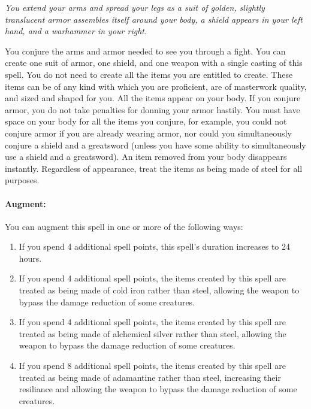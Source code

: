 \emph{You extend your arms and spread your legs as a suit of golden, slightly translucent armor assembles itself around your body, a shield appears in your left hand, and a warhammer in your right.}

You conjure the arms and armor needed to see you through a fight.
You can create one suit of armor, one shield, and one weapon with a single casting of this spell. 
You do not need to create all the items you are entitled to create.
These items can be of any kind with which you are proficient, are of masterwork quality, and sized and shaped for you. 
All the items appear on your body. 
If you conjure armor, you do not take penalties for donning your armor hastily.
You must have space on your body for all the items you conjure, for example, you could not conjure armor if you are already wearing armor, nor could you simultaneously conjure a shield and a greatsword (unless you have some ability to simultaneously use a shield and a greatsword).
An item removed from your body disappears instantly.
Regardless of appearance, treat the items as being made of steel for all purposes.

\paragraph{Augment:} You can augment this spell in one or more of the following ways:
\begin{enumerate}
 \item If you spend 4 additional spell points, this spell's duration increases to 24 hours.
 \item If you spend 4 additional spell points, the items created by this spell are treated as being made of cold iron rather than steel, allowing the weapon to bypass the damage reduction of some creatures.
 \item If you spend 4 additional spell points, the items created by this spell are treated as being made of alchemical silver rather than steel, allowing the weapon to bypass the damage reduction of some creatures.
 \item If you spend 8 additional spell points, the items created by this spell are treated as being made of adamantine rather than steel, increasing their resiliance and allowing the weapon to bypass the damage reduction of some creatures.
\end{enumerate}
